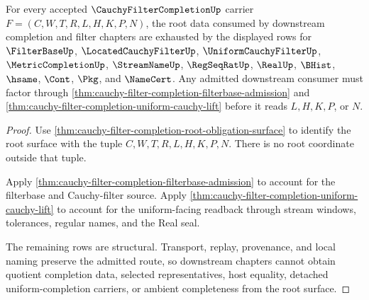 \begin{theorem}
\label{thm:cauchy-filter-completion-root-data-exhaustion}
For every accepted $\CauchyFilterCompletionUp$ carrier $F=(C,W,T,R,L,H,K,P,N)$, the root data consumed by downstream completion and filter chapters are exhausted by the displayed rows for $\FilterBaseUp$, $\LocatedCauchyFilterUp$, $\UniformCauchyFilterUp$, $\MetricCompletionUp$, $\StreamNameUp$, $\RegSeqRatUp$, $\RealUp$, $\BHist$, $\hsame$, $\Cont$, $\Pkg$, and $\NameCert$. Any admitted downstream consumer must factor through \autoref{thm:cauchy-filter-completion-filterbase-admission} and \autoref{thm:cauchy-filter-completion-uniform-cauchy-lift} before it reads $L,H,K,P$, or $N$.
\end{theorem}
\begin{proof}
Use \autoref{thm:cauchy-filter-completion-root-obligation-surface} to identify the root surface with the tuple $C,W,T,R,L,H,K,P,N$. There is no root coordinate outside that tuple.

Apply \autoref{thm:cauchy-filter-completion-filterbase-admission} to account for the filterbase and Cauchy-filter source. Apply \autoref{thm:cauchy-filter-completion-uniform-cauchy-lift} to account for the uniform-facing readback through stream windows, tolerances, regular names, and the Real seal.

The remaining rows are structural. Transport, replay, provenance, and local naming preserve the admitted route, so downstream chapters cannot obtain quotient completion data, selected representatives, host equality, detached uniform-completion carriers, or ambient completeness from the root surface.
\end{proof}

